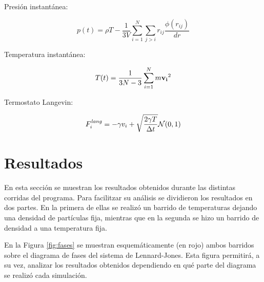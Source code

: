\documentclass[a4paper,12pt]{article}
\begin{document}
Presión instantánea:

\begin{equation}\label{eq:pres}
p(t) = \rho T  - \frac{1}{3V} \sum_{i=1}^N \sum_{j>i} r_{ij} \frac{\phi(r_{ij})}{dr}
\end{equation}

Temperatura instantánea:

\begin{equation}\label{eq:tempe}
 T(t) = \frac{1}{3N-3} \sum_{i=1}^{N} m {\bf v_i}^2
\end{equation}

Termostato Langevin:

\begin{equation}\label{eq:termo}
 F_i^{\it lang} = - \gamma  v_i + \sqrt{\frac{2\gamma T}{\Delta t}} \mathcal N(0,1)
\end{equation}





\section{Resultados}

En esta sección se muestran los resultados obtenidos durante las distintas 
corridas del programa. Para facilitzar su análisis se dividieron los resultados 
en dos partes. En la primera de ellas se realizó un barrido de temperaturas 
dejando una densidad de partículas fija, mientras que en la segunda se hizo un 
barrido de densidad a una temperatura fija.

En la Figura \eqref{fig:fases} se muestran esquemáticamente (en rojo) ambos 
barridos sobre el diagrama de fases del sistema de Lennard-Jones. Esta figura 
permitirá, a su vez, analizar los resultados obtenidos dependiendo en qué parte 
del diagrama se realizó cada simulación.
\end{document}
